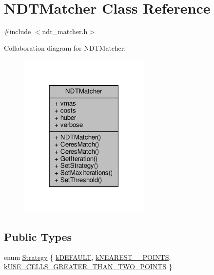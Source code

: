 \hypertarget{classNDTMatcher}{}\section{N\+D\+T\+Matcher Class Reference}
\label{classNDTMatcher}


{\ttfamily \#include $<$ndt\+\_\+matcher.\+h$>$}



Collaboration diagram for N\+D\+T\+Matcher\+:\nopagebreak
\begin{figure}[H]
\begin{center}
\leavevmode
\includegraphics[width=186pt]{df/d9a/classNDTMatcher__coll__graph}
\end{center}
\end{figure}
\subsection*{Public Types}
\begin{DoxyCompactItemize}
\item 
enum \hyperlink{classNDTMatcher_a475619f9aa3d6a4f0dccad583c1306fb}{Strategy} \{ \hyperlink{classNDTMatcher_a475619f9aa3d6a4f0dccad583c1306fba9614712e9b0bc36a56a7f7f25af64e8b}{k\+D\+E\+F\+A\+U\+LT}, 
\hyperlink{classNDTMatcher_a475619f9aa3d6a4f0dccad583c1306fbabf04ff9083995dd8b01b75d6969431b1}{k\+N\+E\+A\+R\+E\+S\+T\+\_\+\_\+\+P\+O\+I\+N\+TS}, 
\hyperlink{classNDTMatcher_a475619f9aa3d6a4f0dccad583c1306fba739c1f03f3e56789ecadd3005b24b612}{k\+U\+S\+E\+\_\+\+C\+E\+L\+L\+S\+\_\+\+G\+R\+E\+A\+T\+E\+R\+\_\+\+T\+H\+A\+N\+\_\+\+T\+W\+O\+\_\+\+P\+O\+I\+N\+TS}
 \}
\end{DoxyCompactItemize}
